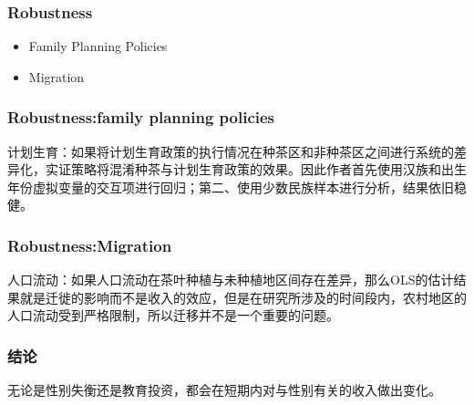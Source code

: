 \documentclass{beamer}
\begin{document}
\begin{frame}
    \frametitle{Robustness}
    \begin{itemize}
        \item Family Planning Policies
        \item Migration
    \end{itemize}
\end{frame}

\begin{frame}
    \frametitle{Robustness:family planning policies}
    计划生育：如果将计划生育政策的执行情况在种茶区和非种茶区之间进行系统的差异化，实证策略将混淆种茶与计划生育政策的效果。因此作者首先使用汉族和出生年份虚拟变量的交互项进行回归；第二、使用少数民族样本进行分析，结果依旧稳健。
\end{frame}


\begin{frame}
    \frametitle{Robustness:Migration}
    人口流动：如果人口流动在茶叶种植与未种植地区间存在差异，那么OLS的估计结果就是迁徙的影响而不是收入的效应，但是在研究所涉及的时间段内，农村地区的人口流动受到严格限制，所以迁移并不是一个重要的问题。
\end{frame}




\begin{frame}
    \frametitle{结论}
    无论是性别失衡还是教育投资，都会在短期内对与性别有关的收入做出变化。
\end{frame}
\end{document}
